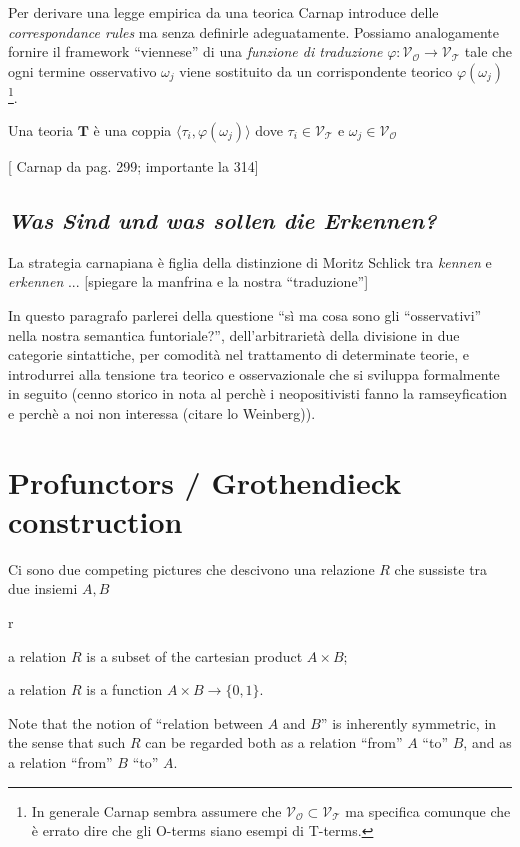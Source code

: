\documentclass[a4paper]{../birkjour}
\newcommand{\bk}[1]{\langle #1\rangle}
\begin{document}
Per derivare una legge empirica da una teorica Carnap introduce delle \emph{correspondance rules} ma senza definirle adeguatamente. Possiamo analogamente fornire il framework ``viennese'' di una \emph{funzione di traduzione} $\varphi: \mathcal{V_O} \to \mathcal{V_T}$ tale che ogni termine osservativo $\omega_j$ viene sostituito da un corrispondente teorico $\varphi (\omega_j)$ \footnote{In generale Carnap sembra assumere che $\mathcal{V_O} \subset \mathcal{V_T}$ ma specifica comunque che è errato dire che gli O-terms siano esempi di T-terms.}. 

\begin{definition} 
	Una teoria $\mathbf{T}$ è una coppia $\bk{\tau_i, \varphi (\omega_j)}$ dove $\tau_i \in \mathcal{V_T}$ e $\omega_j \in \mathcal{V_O}$
\end{definition}



[\cite{} Carnap da pag. 299; importante la 314]

\subsection{\emph{Was Sind und was sollen die Erkennen?}}

La strategia carnapiana è figlia della distinzione di Moritz Schlick \cite{.} tra \emph{kennen} e \emph{erkennen} ... [spiegare la manfrina e la nostra ``traduzione'']

In questo paragrafo parlerei della questione ``sì ma cosa sono gli ``osservativi'' nella nostra semantica funtoriale?'', dell'arbitrarietà della divisione in due categorie sintattiche, per comodità nel trattamento di determinate teorie, e introdurrei alla tensione tra teorico e osservazionale che si sviluppa formalmente in seguito (cenno storico in nota al perchè i neopositivisti fanno la ramseyfication e perchè a noi non interessa (citare lo Weinberg)).  

\section{Profunctors / Grothendieck construction}
\label{sec:org7dd09e1}
Ci sono due competing pictures che descivono una relazione $R$ che sussiste tra due insiemi $A,B$
\begin{enumtag}{r}
\item \label{r_1} a relation $R$ is a subset of the cartesian product $A\times B$;
\item \label{r_2} a relation $R$ is a function $A\times B \to \{0,1\}$.
\end{enumtag}
Note that the notion of ``relation between $A$ and $B$'' is inherently symmetric, in the sense that such $R$ can be regarded both as a relation ``from'' $A$ ``to'' $B$, and as a relation ``from'' $B$ ``to'' $A$.
\end{document}
